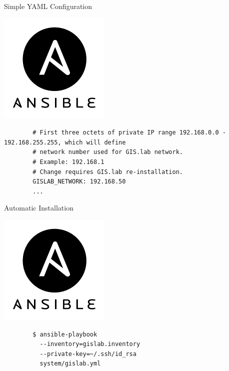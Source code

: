 \documentclass[12pt]{beamer}
\begin{document}
\begin{frame}[fragile]{Simple YAML Configuration}
	\begin{center}
		\includegraphics[keepaspectratio=true,height=0.4\textheight]{images/ansible.png}
	\end{center}

   \lstset{language=sh}
	\begin{lstlisting}
		# First three octets of private IP range 192.168.0.0 - 192.168.255.255, which will define
		# network number used for GIS.lab network.
		# Example: 192.168.1
		# Change requires GIS.lab re-installation.
		GISLAB_NETWORK: 192.168.50
		...
	\end{lstlisting}
\end{frame}

\begin{frame}[fragile]{Automatic Installation}
	\begin{center}
		\includegraphics[keepaspectratio=true,height=0.4\textheight]{images/ansible.png}
	\end{center}

   \lstset{language=sh}
	\begin{lstlisting}
		$ ansible-playbook
		  --inventory=gislab.inventory
		  --private-key=~/.ssh/id_rsa
		  system/gislab.yml
	\end{lstlisting}
\end{frame}
\end{document}
